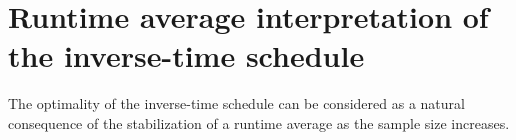 \documentclass[reprint, superscriptaddress, floatfix]{revtex4-1}
\begin{document}
\appendix




\section{\label{sec:equilerr}
Runtime average interpretation
of the inverse-time schedule
}


The optimality of the inverse-time schedule can be considered
as a natural consequence of the stabilization of a runtime average
as the sample size increases\cite{
  marsili2006, barducci2008}.
%
\end{document}
